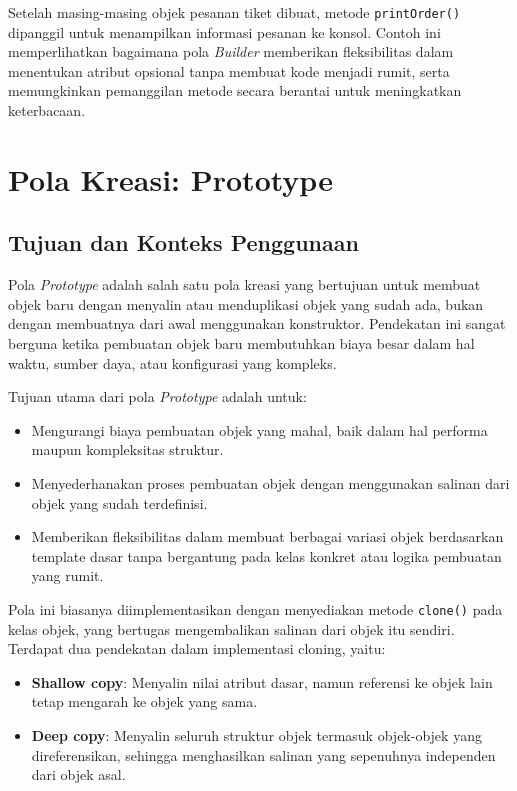 Setelah masing-masing objek pesanan tiket dibuat, metode \texttt{printOrder()} dipanggil untuk menampilkan informasi pesanan ke konsol. Contoh ini memperlihatkan bagaimana pola \textit{Builder} memberikan fleksibilitas dalam menentukan atribut opsional tanpa membuat kode menjadi rumit, serta memungkinkan pemanggilan metode secara berantai untuk meningkatkan keterbacaan.

\section{Pola Kreasi: Prototype}

\subsection{Tujuan dan Konteks Penggunaan}

Pola \textit{Prototype} adalah salah satu pola kreasi yang bertujuan untuk membuat objek baru dengan menyalin atau menduplikasi objek yang sudah ada, bukan dengan membuatnya dari awal menggunakan konstruktor. Pendekatan ini sangat berguna ketika pembuatan objek baru membutuhkan biaya besar dalam hal waktu, sumber daya, atau konfigurasi yang kompleks.

Tujuan utama dari pola \textit{Prototype} adalah untuk:
\begin{itemize}
\item Mengurangi biaya pembuatan objek yang mahal, baik dalam hal performa maupun kompleksitas struktur.
\item Menyederhanakan proses pembuatan objek dengan menggunakan salinan dari objek yang sudah terdefinisi.
\item Memberikan fleksibilitas dalam membuat berbagai variasi objek berdasarkan template dasar tanpa bergantung pada kelas konkret atau logika pembuatan yang rumit.
\end{itemize}

Pola ini biasanya diimplementasikan dengan menyediakan metode \texttt{clone()} pada kelas objek, yang bertugas mengembalikan salinan dari objek itu sendiri. Terdapat dua pendekatan dalam implementasi cloning, yaitu:
\begin{itemize}
\item \textbf{Shallow copy}: Menyalin nilai atribut dasar, namun referensi ke objek lain tetap mengarah ke objek yang sama.
\item \textbf{Deep copy}: Menyalin seluruh struktur objek termasuk objek-objek yang direferensikan, sehingga menghasilkan salinan yang sepenuhnya independen dari objek asal.
\end{itemize}

